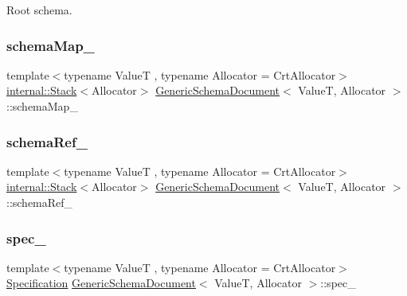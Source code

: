 Root schema. 

\mbox{\label{classGenericSchemaDocument_a75a97c9f8cd1cc8cd67f3b6364d93744}} 
\subsubsection{\texorpdfstring{schema\+Map\+\_\+}{schemaMap\_}}
{\footnotesize\ttfamily template$<$typename ValueT , typename Allocator  = Crt\+Allocator$>$ \\
\hyperlink{classinternal_1_1Stack}{internal\+::\+Stack}$<$Allocator$>$ \hyperlink{classGenericSchemaDocument}{Generic\+Schema\+Document}$<$ ValueT, Allocator $>$\+::schema\+Map\+\_\+\hspace{0.3cm}{\ttfamily [private]}}

\mbox{\label{classGenericSchemaDocument_a0c3ee68d07de1c96f1954ad66c6e6d23}} 
\subsubsection{\texorpdfstring{schema\+Ref\+\_\+}{schemaRef\_}}
{\footnotesize\ttfamily template$<$typename ValueT , typename Allocator  = Crt\+Allocator$>$ \\
\hyperlink{classinternal_1_1Stack}{internal\+::\+Stack}$<$Allocator$>$ \hyperlink{classGenericSchemaDocument}{Generic\+Schema\+Document}$<$ ValueT, Allocator $>$\+::schema\+Ref\+\_\+\hspace{0.3cm}{\ttfamily [private]}}

\mbox{\label{classGenericSchemaDocument_a1e844ef6ec640afa79f184c0484aa7d1}} 
\subsubsection{\texorpdfstring{spec\+\_\+}{spec\_}}
{\footnotesize\ttfamily template$<$typename ValueT , typename Allocator  = Crt\+Allocator$>$ \\
\hyperlink{structSpecification}{Specification} \hyperlink{classGenericSchemaDocument}{Generic\+Schema\+Document}$<$ ValueT, Allocator $>$\+::spec\+\_\+\hspace{0.3cm}{\ttfamily [private]}}

